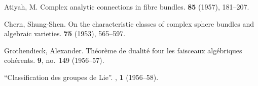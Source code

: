\documentclass{article}
\begin{document}

\nocite{*}

\begin{thebibliography}{4}

  {Atiyah, M.}
  \newblock Complex analytic connections in fibre bundles.
   {\bf 85} (1957), 181--207.

  {Chern, Shung-Shen.}
  \newblock On the characteristic classes of complex sphere bundles and algebraic varieties.
   {\bf 75} (1953), 565--597.

  {Grothendieck, Alexander.}
  \newblock Th\'{e}or\`{e}me de dualit\'{e} four les faisceaux alg\'{e}briques coh\'{e}rents.
   {\bf 9}, no.~149 (1956--57).

  ``Classification des groupes de Lie''.
  , {\bf 1} (1956--58).

\end{thebibliography}
\end{document}
